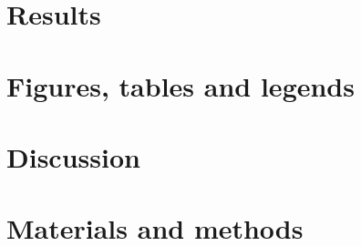 \documentclass[11pt,a4paper]{report}
\begin{document}
\section*{Results}
\section*{Figures, tables and legends}


\section*{Discussion}
\section*{Materials and methods}

\fancyhead[L]{\slshape }

\end{document}
